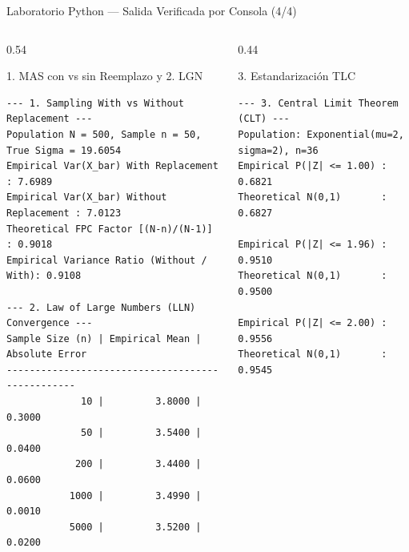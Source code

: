 \documentclass[10pt, aspectratio=169]{beamer}
\begin{document}
\begin{frame}[fragile]{Laboratorio Python --- Salida Verificada por Consola (4/4)}
  \vspace{-0.1cm}
  \begin{columns}[T]
    \begin{column}{0.54\textwidth}
      \begin{block}{1. MAS con vs sin Reemplazo y 2. LGN}
        \fontsize{4.4pt}{5.2pt}\selectfont
\begin{verbatim}
--- 1. Sampling With vs Without Replacement ---
Population N = 500, Sample n = 50, True Sigma = 19.6054
Empirical Var(X_bar) With Replacement    : 7.6989
Empirical Var(X_bar) Without Replacement : 7.0123
Theoretical FPC Factor [(N-n)/(N-1)]     : 0.9018
Empirical Variance Ratio (Without / With): 0.9108

--- 2. Law of Large Numbers (LLN) Convergence ---
Sample Size (n) | Empirical Mean | Absolute Error
-------------------------------------------------
             10 |         3.8000 |         0.3000
             50 |         3.5400 |         0.0400
            200 |         3.4400 |         0.0600
           1000 |         3.4990 |         0.0010
           5000 |         3.5200 |         0.0200
\end{verbatim}
      \end{block}
    \end{column}
    \begin{column}{0.44\textwidth}
      \begin{block}{3. Estandarización TLC}
        \fontsize{4.4pt}{5.2pt}\selectfont
\begin{verbatim}
--- 3. Central Limit Theorem (CLT) ---
Population: Exponential(mu=2, sigma=2), n=36
Empirical P(|Z| <= 1.00) : 0.6821
Theoretical N(0,1)       : 0.6827

Empirical P(|Z| <= 1.96) : 0.9510
Theoretical N(0,1)       : 0.9500

Empirical P(|Z| <= 2.00) : 0.9556
Theoretical N(0,1)       : 0.9545
\end{verbatim}
      \end{block}
    \end{column}
  \end{columns}
\end{frame}
\end{document}
